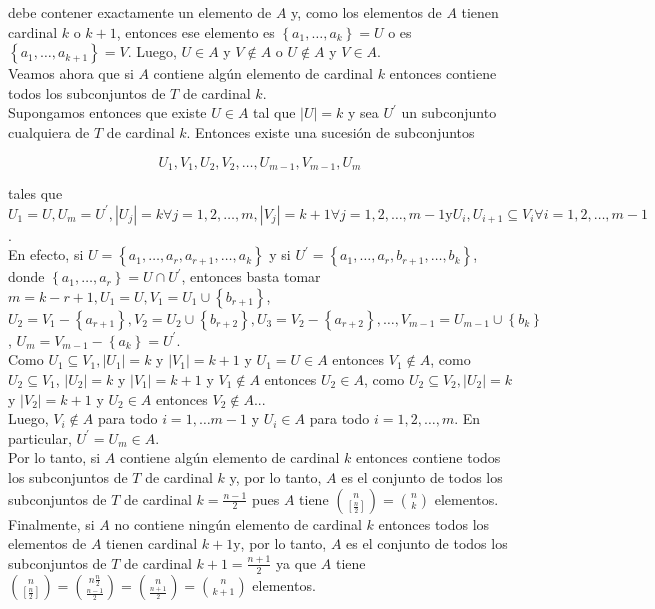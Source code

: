 \documentclass[10pt]{article}
\begin{document}
debe contener exactamente un elemento de $A$ y, como los elementos de $A$ tienen cardinal $k$ o $k+1$, entonces ese elemento es $\left\{a_{1}, \ldots, a_{k}\right\}=U$ o es $\left\{a_{1}, \ldots, a_{k+1}\right\}=V$. Luego, $U \in A$ y $V \notin A$ o $U \notin A$ y $V \in A$.\\
Veamos ahora que si $A$ contiene algún elemento de cardinal $k$ entonces contiene todos los subconjuntos de $T$ de cardinal $k$.\\
Supongamos entonces que existe $U \in A$ tal que $|U|=k$ y sea $U^{\prime}$ un subconjunto cualquiera de $T$ de cardinal $k$. Entonces existe una sucesión de subconjuntos

$$
U_{1}, V_{1}, U_{2}, V_{2}, \ldots, U_{m-1}, V_{m-1}, U_{m}
$$

tales que $U_{1}=U, U_{m}=U^{\prime},\left|U_{j}\right|=k \forall j=1,2, \ldots, m,\left|V_{j}\right|=k+1 \forall j=1,2, \ldots, m-1 \mathrm{y} U_{i}, U_{i+1} \subseteq V_{i} \forall i=1,2, \ldots, m-1$.\\
En efecto, si $U=\left\{a_{1}, \ldots, a_{r}, a_{r+1}, \ldots, a_{k}\right\}$ y si $U^{\prime}=\left\{a_{1}, \ldots, a_{r}, b_{r+1}, \ldots, b_{k}\right\}$, donde $\left\{a_{1}, \ldots, a_{r}\right\}=U \cap U^{\prime}$, entonces basta tomar $m=k-r+1, U_{1}=U, V_{1}=U_{1} \cup\left\{b_{r+1}\right\}$, $U_{2}=V_{1}-\left\{a_{r+1}\right\}, V_{2}=U_{2} \cup\left\{b_{r+2}\right\}, U_{3}=V_{2}-\left\{a_{r+2}\right\}, \ldots, V_{m-1}=U_{m-1} \cup\left\{b_{k}\right\}$, $U_{m}=V_{m-1}-\left\{a_{k}\right\}=U^{\prime}$.\\
Como $U_{1} \subseteq V_{1},\left|U_{1}\right|=k$ y $\left|V_{1}\right|=k+1$ y $U_{1}=U \in A$ entonces $V_{1} \notin A$, como $U_{2} \subseteq V_{1}$, $\left|U_{2}\right|=k$ y $\left|V_{1}\right|=k+1$ y $V_{1} \notin A$ entonces $U_{2} \in A$, como $U_{2} \subseteq V_{2},\left|U_{2}\right|=k$ y $\left|V_{2}\right|=k+1$ y $U_{2} \in A$ entonces $V_{2} \notin A$...\\
Luego, $V_{i} \notin A$ para todo $i=1, \ldots m-1$ y $U_{i} \in A$ para todo $i=1,2, \ldots, m$. En particular, $U^{\prime}=U_{m} \in A$.\\
Por lo tanto, si $A$ contiene algún elemento de cardinal $k$ entonces contiene todos los subconjuntos de $T$ de cardinal $k$ y, por lo tanto, $A$ es el conjunto de todos los subconjuntos de $T$ de cardinal $k=\frac{n-1}{2}$ pues $A$ tiene $\binom{n}{\left[\frac{n}{2}\right]}=\binom{n}{k}$ elementos.\\
Finalmente, si $A$ no contiene ningún elemento de cardinal $k$ entonces todos los elementos de $A$ tienen cardinal $k+1 \mathrm{y}$, por lo tanto, $A$ es el conjunto de todos los subconjuntos de $T$ de cardinal $k+1=\frac{n+1}{2}$ ya que $A$ tiene $\binom{n}{\left[\frac{n}{2}\right]}=\binom{n \frac{n}{2}}{\frac{n-1}{2}}=\binom{n}{\frac{n+1}{2}}=\binom{n}{k+1}$ elementos.
\end{document}
